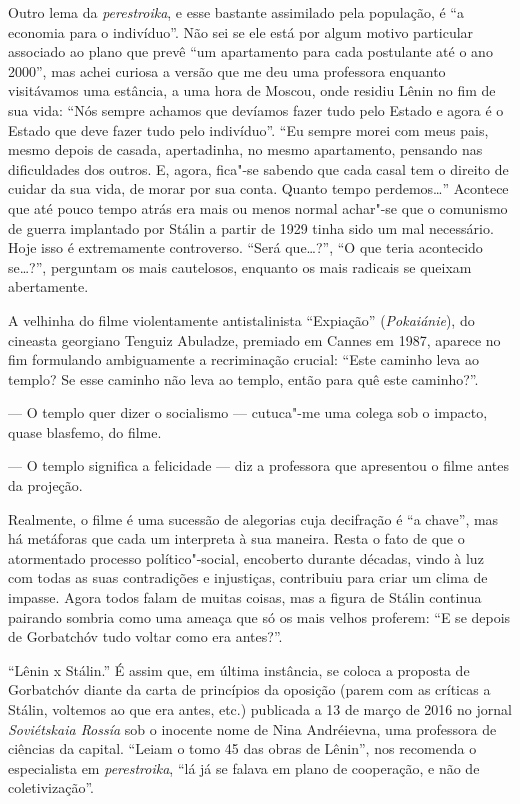 Outro lema da \emph{perestroika}, e esse bastante assimilado pela população, é ``a economia para o indivíduo''. Não sei se ele está por algum motivo particular associado ao plano que prevê ``um apartamento para cada postulante até o ano 2000'', mas achei curiosa a versão que me deu uma professora enquanto visitávamos uma estância, a uma hora de Moscou, onde residiu Lênin no fim de sua vida: ``Nós sempre achamos que devíamos fazer tudo pelo Estado e agora é o Estado que deve fazer tudo pelo indivíduo''. ``Eu sempre morei com meus pais, mesmo depois de casada, apertadinha, no mesmo apartamento, pensando nas dificuldades dos outros. E, agora, fica"-se sabendo que cada casal tem o direito de cuidar da sua vida, de morar por sua conta. Quanto tempo perdemos\ldots{}'' Acontece que até pouco tempo atrás era mais ou menos normal achar"-se que o comunismo de guerra implantado por Stálin a partir de 1929 tinha sido um mal necessário. Hoje isso é extremamente controverso. ``Será que\ldots{}?'', ``O que teria acontecido se\ldots{}?'', perguntam os mais cautelosos, enquanto os mais radicais se queixam abertamente.

A velhinha do filme violentamente antistalinista ``Expiação'' (\emph{Pokaiánie}), do cineasta georgiano Tenguiz Abuladze, premiado em Cannes em 1987, aparece no fim formulando ambiguamente a recriminação crucial: ``Este caminho leva ao templo? Se esse caminho não leva ao templo, então para quê este caminho?''.

--- O templo quer dizer o socialismo --- cutuca"-me uma colega sob o impacto, quase blasfemo, do filme.

--- O templo significa a felicidade --- diz a professora que apresentou o filme antes da projeção.

Realmente, o filme é uma sucessão de alegorias cuja decifração é ``a chave'', mas há metáforas que cada um interpreta à sua maneira. Resta o fato de que o atormentado processo político"-social, encoberto durante décadas, vindo à luz com todas as suas contradições e injustiças, contribuiu para criar um clima de impasse. Agora todos falam de muitas coisas, mas a figura de Stálin continua pairando sombria como uma ameaça que só os mais velhos proferem: ``E se depois de Gorbatchóv tudo voltar como era antes?''.

``Lênin x Stálin.'' É assim que, em última instância, se coloca a proposta de Gorbatchóv diante da carta de princípios da oposição (parem com as críticas a Stálin, voltemos ao que era antes, etc.) publicada a 13 de março de 2016 no jornal \emph{Soviétskaia Rossía} sob o inocente nome de Nina Andréievna, uma professora de ciências da capital. ``Leiam o tomo 45 das obras de Lênin'', nos recomenda o especialista em \emph{perestroika}, ``lá já se falava em plano de cooperação, e não de coletivização''.

